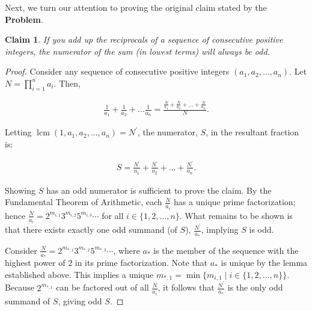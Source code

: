 \documentclass{article}
\newtheorem*{claim}{Claim}
\DeclareMathOperator{\lcm}{lcm}
\begin{document}
Next, we turn our attention to proving the original claim stated by the \textbf{Problem}.

\begin{claim}
  If you add up the reciprocals of a sequence of consecutive positive integers, the numerator of the sum (in lowest terms) will always be odd.
\end{claim}


\begin{proof}

  Consider any sequence of consecutive positive integers $(a_{1}, a_{2}, \ldots, a_{n})$.
  Let $N = \prod_{i=1}^{n} a_{i}$. Then, 

  \begin{align*}
    \frac{1}{a_1} + \frac{1}{a_2} + \ldots \frac{1}{a_n} = \frac{\frac{N}{a_1} + \frac{N}{a_2} + \ldots + \frac{N}{a_n}}{N}.
  \end{align*}

  Letting $\lcm(1, a_{1}, a_{2}, \ldots, a_{n}) = N^{\prime}$, the numerator, $S$, in the resultant fraction is:

  \begin{align*}
    S = \frac{N^{\prime}}{a_1} + \frac{N^{\prime}}{a_2} + \ldots + \frac{N^{\prime}}{a_n}.
  \end{align*}

  Showing $S$ has an odd numerator is sufficient to prove the claim. By the Fundamental Theorem of Arithmetic, each $\frac{N}{a_i}$ has a unique prime factorization; hence $\frac{N}{a_i} = 2^{m_{i,1}}3^{m_{i,2}}5^{m_{i,3}}\cdots$ for all $i \in \lbrace 1, 2, \ldots, n \rbrace$.
  What remains to be shown is that there exists exactly one odd summand (of $S$), $\frac{N^{\prime}}{a_{*}}$, implying $S$ is odd.

  Consider $\frac{N}{a_{*}} = 2^{m_{*,1}}3^{m_{*,2}}5^{m_{*,3}}\cdots$, where $a_{*}$ is the member of the sequence with the highest power of $2$ in its prime factorization. Note that $a_{*}$ is unique by the lemma established above.
  This implies a unique $m_{*,1} = \min \lbrace m_{i, 1} \mid i \in \lbrace 1, 2, \ldots, n \rbrace \rbrace$.
  Because $2^{m_{*,1}}$ can be factored out of all $\frac{N}{a_{i}}$, it follows that $\frac{N^{\prime}}{a_{*}}$ is the only odd summand of $S$, giving odd $S$.

\end{proof}
\end{document}
